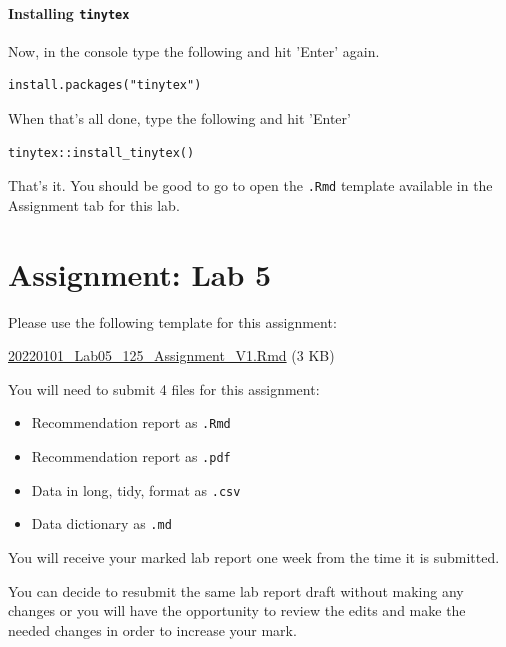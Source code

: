 \documentclass[
]{book}
\providecommand{\tightlist}{%
  \setlength{\itemsep}{0pt}\setlength{\parskip}{0pt}}
\begin{document}
\hypertarget{installing-tinytex}{%
\subsubsection*{\texorpdfstring{Installing \texttt{tinytex}}{Installing tinytex}}\label{installing-tinytex}}

Now, in the console type the following and hit 'Enter' again.

\begin{verbatim}
install.packages("tinytex")
\end{verbatim}

When that's all done, type the following and hit 'Enter'

\begin{verbatim}
tinytex::install_tinytex()
\end{verbatim}

That's it. You should be good to go to open the \texttt{.Rmd} template available in the Assignment tab for this lab.

\hypertarget{assignment-lab-5}{%
\chapter*{Assignment: Lab 5}\label{assignment-lab-5}}

Please use the following template for this assignment:

\href{https://osf.io/download/kcqjs}{20220101\_Lab05\_125\_Assignment\_V1.Rmd} (3 KB)

You will need to submit 4 files for this assignment:

\begin{itemize}
\tightlist
\item
  Recommendation report as \texttt{.Rmd}
\item
  Recommendation report as \texttt{.pdf}
\item
  Data in long, tidy, format as \texttt{.csv}
\item
  Data dictionary as \texttt{.md}
\end{itemize}

You will receive your marked lab report one week from the time it is submitted.

You can decide to resubmit the same lab report draft without making any changes or you will have the opportunity to review the edits and make the needed changes in order to increase your mark.
\end{document}
